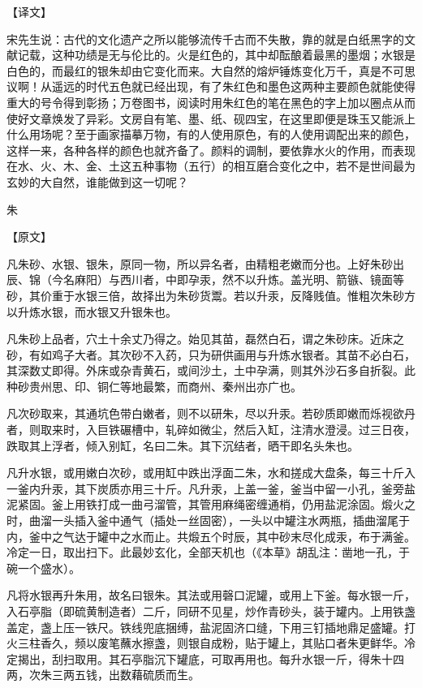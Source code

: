 \documentclass[12pt,UTF8]{ctexbook}
\begin{document}
【译文】

宋先生说：古代的文化遗产之所以能够流传千古而不失散，靠的就是白纸黑字的文献记载，这种功绩是无与伦比的。火是红色的，其中却酝酿着最黑的墨烟；水银是白色的，而最红的银朱却由它变化而来。大自然的熔炉锤炼变化万千，真是不可思议啊！从遥远的时代五色就已经出现，有了朱红色和墨色这两种主要颜色就能使得重大的号令得到彰扬；万卷图书，阅读时用朱红色的笔在黑色的字上加以圈点从而使好文章焕发了异彩。文房自有笔、墨、纸、砚四宝，在这里即便是珠玉又能派上什么用场呢？至于画家描摹万物，有的人使用原色，有的人使用调配出来的颜色，这样一来，各种各样的颜色也就齐备了。颜料的调制，要依靠水火的作用，而表现在水、火、木、金、土这五种事物（五行）的相互磨合变化之中，若不是世间最为玄妙的大自然，谁能做到这一切呢？

朱

【原文】

凡朱砂、水银、银朱，原同一物，所以异名者，由精粗老嫩而分也。上好朱砂出辰、锦（今名麻阳）与西川者，中即孕汞，然不以升炼。盖光明、箭镞、镜面等砂，其价重于水银三倍，故择出为朱砂货鬻。若以升汞，反降贱值。惟粗次朱砂方以升炼水银，而水银又升银朱也。

凡朱砂上品者，穴土十余丈乃得之。始见其苗，磊然白石，谓之朱砂床。近床之砂，有如鸡子大者。其次砂不入药，只为研供画用与升炼水银者。其苗不必白石，其深数丈即得。外床或杂青黄石，或间沙土，土中孕满，则其外沙石多自折裂。此种砂贵州思、印、铜仁等地最繁，而商州、秦州出亦广也。

凡次砂取来，其通坑色带白嫩者，则不以研朱，尽以升汞。若砂质即嫩而烁视欲丹者，则取来时，入巨铁碾槽中，轧碎如微尘，然后入缸，注清水澄浸。过三日夜，跌取其上浮者，倾入别缸，名曰二朱。其下沉结者，晒干即名头朱也。

凡升水银，或用嫩白次砂，或用缸中跌出浮面二朱，水和搓成大盘条，每三十斤入一釜内升汞，其下炭质亦用三十斤。凡升汞，上盖一釜，釜当中留一小孔，釜旁盐泥紧固。釜上用铁打成一曲弓溜管，其管用麻绳密缠通梢，仍用盐泥涂固。煅火之时，曲溜一头插入釜中通气（插处一丝固密），一头以中罐注水两瓶，插曲溜尾于内，釜中之气达于罐中之水而止。共煅五个时辰，其中砂末尽化成汞，布于满釜。冷定一日，取出扫下。此最妙玄化，全部天机也（《本草》胡乱注：凿地一孔，于碗一个盛水）。

凡将水银再升朱用，故名曰银朱。其法或用磬口泥罐，或用上下釜。每水银一斤，入石亭脂（即硫黄制造者）二斤，同研不见星，炒作青砂头，装于罐内。上用铁盏盖定，盏上压一铁尺。铁线兜底捆缚，盐泥固济口缝，下用三钉插地鼎足盛罐。打火三柱香久，频以废笔蘸水擦盏，则银自成粉，贴于罐上，其贴口者朱更鲜华。冷定揭出，刮扫取用。其石亭脂沉下罐底，可取再用也。每升水银一斤，得朱十四两，次朱三两五钱，出数藉硫质而生。
\end{document}
